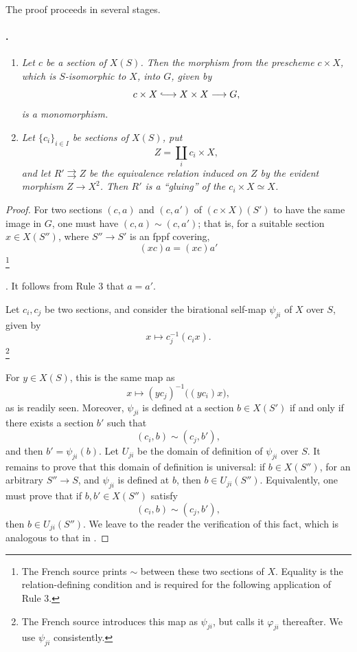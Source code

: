 The proof proceeds in several stages.

\paragraph{.}
\begin{enumerate}
\item[\SGAInlineRefTarget{sga3:xviii:lemma:3.8:item:i}(i)] \textit{Let \(c\) be a section of \(X(S)\). Then the
morphism from the prescheme \(c\times X\), which is
\(S\)-isomorphic to \(X\), into \(G\), given by
\[
  c\times X\lhook\joinrel\longrightarrow X\times X
  \longrightarrow G,
\]
is a monomorphism.}

\item[\SGAInlineRefTarget{sga3:xviii:lemma:3.8:item:ii}(ii)] \textit{Let \(\{c_i\}_{i\in I}\) be sections of
\(X(S)\), put
\[
  Z=\coprod_i c_i\times X,
\]
and let \(R'\rightrightarrows Z\) be the equivalence relation
induced on \(Z\) by the evident morphism \(Z\to X^2\). Then
\(R'\) is a ``gluing'' of the \(c_i\times X\simeq X\).}
\end{enumerate}

\begin{proof}
\textup{} For two sections \((c,a)\) and \((c,a')\) of
\((c\times X)(S')\) to have the same image in \(G\), one must
have \((c,a)\sim(c,a')\); that is, for a suitable section
\(x\in X(S'')\), where \(S''\to S'\) is an fppf covering,
\[
  (xc)a=(xc)a'
\]
\begingroup
\renewcommand{\thefootnote}{\ensuremath{\dagger}}\footnote{The
French source prints \(\sim\) between these two sections of
\(X\). Equality is the relation-defining condition and is
required for the following application of Rule 3.}
\addtocounter{footnote}{-1}
\endgroup.
It follows from Rule 3 that \(a=a'\).

\textup{} Let \(c_i,c_j\) be two sections, and consider the
birational self-map \(\psi_{ji}\) of \(X\) over \(S\), given by
\[
  x\longmapsto c_j^{-1}(c_i x).
\]
\begingroup
\renewcommand{\thefootnote}{\ensuremath{\ddagger}}\footnote{The
French source introduces this map as \(\psi_{ji}\), but calls it
\(\varphi_{ji}\) thereafter. We use \(\psi_{ji}\) consistently.}
\addtocounter{footnote}{-1}
\endgroup
For \(y\in X(S)\), this is the same map as
\[
  x\longmapsto (yc_j)^{-1}\bigl((yc_i)x\bigr),
\]
as is readily seen. Moreover, \(\psi_{ji}\) is defined at a
section \(b\in X(S')\) if and only if there exists a section
\(b'\) such that
\[
  (c_i,b)\sim(c_j,b'),
\]
and then \(b'=\psi_{ji}(b)\). Let \(U_{ji}\) be the domain of
definition of \(\psi_{ji}\) over \(S\). It remains to prove that
this domain of definition is universal: if \(b\in X(S'')\), for
an arbitrary \(S''\to S\), and \(\psi_{ji}\) is defined at
\(b\), then \(b\in U_{ji}(S'')\). Equivalently, one must prove
that if \(b,b'\in X(S'')\) satisfy
\[
  (c_i,b)\sim(c_j,b'),
\]
then \(b\in U_{ji}(S'')\). We leave to the reader the
verification of this fact, which is analogous to that in .
\end{proof}


